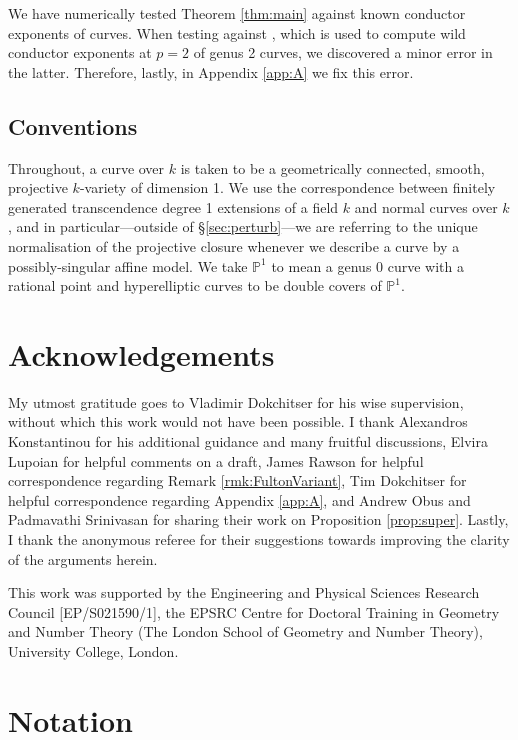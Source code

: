 \documentclass[12pt]{amsart}
\theoremstyle{definition}
\theoremstyle{remark}
\newcommand{\Proj}{\mathbb{P}}
\newcommand{\nocontentsline}[3]{}
\let\origcontentsline\addcontentsline
\newcommand\stoptoc{\let\addcontentsline\nocontentsline}
\newcommand\resumetoc{\let\addcontentsline\origcontentsline}
\begin{document}
We have numerically tested Theorem \ref{thm:main} against known conductor exponents of curves. When testing against \cite[Proposition 4.1]{DokDoris}, which is used to compute wild conductor exponents at $p=2$ of genus 2 curves, we discovered a minor error in the latter. Therefore, lastly, in Appendix \ref{app:A} we fix this error.

\subsection*{Conventions} Throughout, a curve over $k$ is taken to be a geometrically connected, smooth, projective $k$-variety of dimension 1. We use the correspondence between finitely generated transcendence degree 1 extensions of a field $k$ and normal curves over $k$, and in particular---outside of \S\ref{sec:perturb}---we are referring to the unique normalisation of the projective closure whenever we describe a curve by a possibly-singular affine model. We take $\Proj^1$ to mean a genus $0$ curve with a rational point and hyperelliptic curves to be double covers of $\Proj^1$.

\stoptoc
\section*{\small{Acknowledgements}}
\resumetoc

My utmost gratitude goes to Vladimir Dokchitser for his wise supervision, without which this work would not have been possible. I thank Alexandros Konstantinou for his additional guidance and many fruitful discussions, Elvira Lupoian for helpful comments on a draft, James Rawson for helpful correspondence regarding Remark \ref{rmk:FultonVariant}, Tim Dokchitser for helpful correspondence regarding Appendix \ref{app:A}, and Andrew Obus and Padmavathi Srinivasan for sharing their work on Proposition \ref{prop:super}. Lastly, I thank the anonymous referee for their suggestions towards improving the clarity of the arguments herein.

This work was supported by the Engineering and Physical Sciences Research Council [EP/S021590/1], the EPSRC Centre for Doctoral Training in Geometry and Number Theory (The London School of Geometry and Number Theory), University College, London.

\section{Notation}
\end{document}

